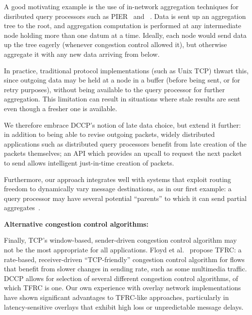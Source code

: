 \documentclass[10pt,twocolumn]{article}
\renewcommand{\subsection}[1]{\vspace{10pt}\noindent\textbf{#1:}\vspace{5pt}}
\begin{document}
A good motivating example is the use of in-network
aggregation techniques for disributed query processors such as
PIER~\cite{pier-cidr} and ~\cite{Yalagandula2004}.  Data is sent
up an aggregation tree to the
root, and aggregation computation is performed at any intermediate
node holding more than one datum at a time.  Ideally, each node
would send data up the tree eagerly (whenever congestion
control allowed it), but otherwise aggregate it with any new data
arriving from below. 

In practice, traditional protocol implementations
(such as Unix TCP) thwart this, since outgoing data may be held at a
node in a buffer (before being sent, or for retry purposes), without
being available to the query processor for further aggregation. This limitation
can result in situations where stale results are sent even though a fresher one
is available. 

We therefore embrace DCCP's notion of late data choice, but extend
it further: in addition to being able to revise outgoing packets, widely
distributed applications such as distributed query processors
benefit from late creation of the packets themselves; an API which
provides an upcall to request the next packet to send allows
intelligent just-in-time creation of packets.   

Furthermore, our approach integrates well with systems that exploit
routing freedom to dynamically vary message destinations, as in our
first example: a query processor may have several potential
``parents'' to which it can send partial aggregates~\cite{gibbons-sensys04}. 

\subsection{Alternative congestion control algorithms}

Finally, TCP's window-based, sender-driven congestion control
algorithm may not be the most appropriate for all applications.  Floyd
et al.~\cite{floyd00equationbased} propose TFRC: a rate-based,
receiver-driven ``TCP-friendly'' congestion control algorithm for
flows that benefit from slower changes in sending rate, such as some
multimedia traffic.  DCCP allows for selection of several different
congestion control algorithms, of which TFRC is one. 
Our own experience with overlay network implementations have shown
significant advantages to TFRC-like approaches, particularly in
latency-sensitive overlays that exhibit high loss or unpredictable
message delays. 
\end{document}
